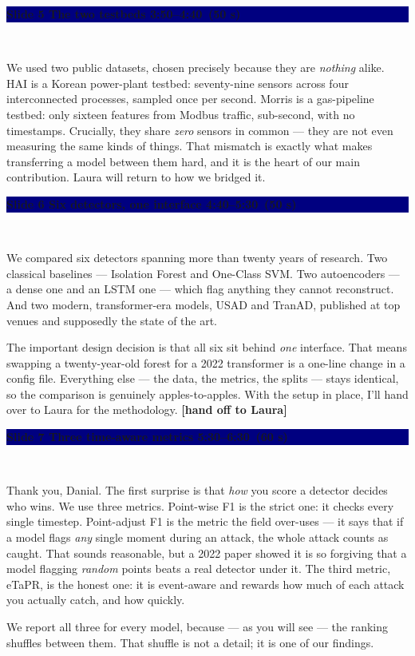 \documentclass[11pt,a4paper]{article}
\newcommand{\spk}[1]{{\color{teal}\bfseries #1}}
\newcommand{\slide}[5]{%
  \medskip
  \noindent\colorbox{navy}{\parbox{\dimexpr\textwidth-2\fboxsep}{%
    \color{white}\bfseries Slide #1 \;\textbar\; #2
    \hfill {\normalfont\color{lightbg}\small #4 \,(#5)}}}\\[2pt]
  \noindent{\color{teal}\small\textbf{Speaker: #3}}\par\vspace{2pt}%
}
\begin{document}
\slide{5}{The two testbeds}{Danial}{3:50--4:40}{50 s}
We used two public datasets, chosen precisely because they are \textit{nothing} alike. HAI is a Korean power-plant testbed: seventy-nine sensors across four interconnected processes, sampled once per second. Morris is a gas-pipeline testbed: only sixteen features from Modbus traffic, sub-second, with no timestamps. Crucially, they share \textit{zero} sensors in common --- they are not even measuring the same kinds of things. That mismatch is exactly what makes transferring a model between them hard, and it is the heart of our main contribution. Laura will return to how we bridged it.

\slide{6}{Six detectors, one interface}{Danial}{4:40--5:30}{50 s}
We compared six detectors spanning more than twenty years of research. Two classical baselines --- Isolation Forest and One-Class SVM. Two autoencoders --- a dense one and an LSTM one --- which flag anything they cannot reconstruct. And two modern, transformer-era models, USAD and TranAD, published at top venues and supposedly the state of the art.

The important design decision is that all six sit behind \textit{one} interface. That means swapping a twenty-year-old forest for a 2022 transformer is a one-line change in a config file. Everything else --- the data, the metrics, the splits --- stays identical, so the comparison is genuinely apples-to-apples. With the setup in place, I'll hand over to Laura for the methodology. \spk{[hand off to Laura]}

\slide{7}{Three time-aware metrics}{Laura}{5:30--6:30}{60 s}
Thank you, Danial. The first surprise is that \textit{how} you score a detector decides who wins. We use three metrics. Point-wise F1 is the strict one: it checks every single timestep. Point-adjust F1 is the metric the field over-uses --- it says that if a model flags \textit{any} single moment during an attack, the whole attack counts as caught. That sounds reasonable, but a 2022 paper showed it is so forgiving that a model flagging \textit{random} points beats a real detector under it. The third metric, eTaPR, is the honest one: it is event-aware and rewards how much of each attack you actually catch, and how quickly.

We report all three for every model, because --- as you will see --- the ranking shuffles between them. That shuffle is not a detail; it is one of our findings.
\end{document}
